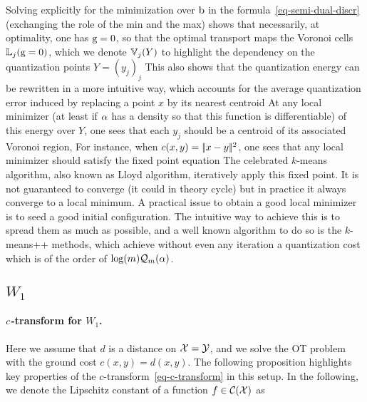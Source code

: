  
Solving explicitly for the minimization over $\mathrm{b}$ in the formula~\eqref{eq-semi-dual-discr} (exchanging the role of the min and the max) shows that necessarily, at optimality, one has $\mathrm{g}=0$, so that the optimal transport maps the Voronoi cells $\mathbb{L}_{j}(\mathrm{g}=0)$, which we denote $\mathbb{V}_j(Y)$ to highlight the dependency on the quantization points $Y=(y_j)_j$
This also shows that the quantization energy can be rewritten in a more intuitive way, which accounts for the average quantization error induced by replacing a point $x$ by its nearest centroid
At any local minimizer (at least if $\alpha$ has a density so that this function is differentiable) of this energy over $Y$, one sees that each $y_j$ should be a centroid of its associated Voronoi region, 
For instance, when $c(x,y)=|\!| x-y |\!|^2$, one sees that any local minimizer should satisfy the fixed point equation
The celebrated $k$-means algorithm, also known as Lloyd algorithm, iteratively apply this fixed point. It is not guaranteed to converge (it could in theory cycle) but in practice it always converge to a local minimum. 
%
A practical issue to obtain a good local minimizer is to seed a good initial configuration. The intuitive way to achieve this is to spread them as much as possible, and a well known algorithm to do so is the $k$-means++ methods, which achieve without even any iteration a quantization cost which is of the order of $\log(m) \mathcal{Q}_m(\alpha)$.  
 

\subsection{$W_1$}
\label{sec-W1}

\paragraph{$c$-transform for $W_1$.}

Here we assume that $d$ is a distance on $\mathcal{X}=\mathcal{Y}$, and we solve the OT problem with the ground cost $c(x,y)=d(x,y)$. The following proposition highlights key properties of the $c$-transform~\eqref{eq-c-transform} in this setup. In the following, we denote the Lipschitz constant of a function $f \in \mathcal{C}(\mathcal{X})$ as

